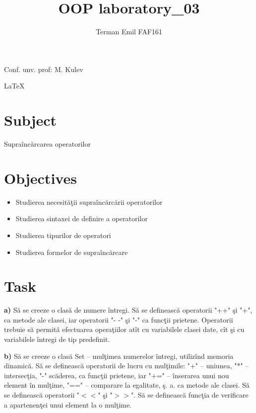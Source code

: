 \documentclass{article}
\begin{document}
	\newcommand{\cppInLine}[1]{
		{\lstinline[basicstyle=\small]|#1|}
	}

	\title{OOP laboratory\_03}
	\author{Terman Emil FAF161}
	\maketitle

	\vspace*{\fill}
	
	\begin{flushright}
		Conf. unv. prof: M. Kulev
	\end{flushright}

	\begin{center}
		\LaTeX
	\end{center}

	\pagebreak

	\section{Subject}
		Supraîncărcarea operatorilor
	\section{Objectives}
		\begin{itemize}
			\item Studierea necesităţii supraîncărcării operatorilor
			\item Studierea sintaxei de definire a operatorilor
			\item Studierea tipurilor de operatori
			\item Studierea formelor de supraîncărcare
		\end{itemize}

	\section{Task}
		\textbf{a)} Să se creeze o clasă de numere întregi. Să se definească operatorii "++" şi "+", ca metode ale clasei, iar operatorii "- -" şi "-" ca funcţii prietene. Operatorii trebuie să permită efectuarea operaţiilor atît cu variabilele clasei date, cît şi cu variabilele întregi de tip predefinit.

		\textbf{b)} Să se creeze o clasă Set – mulţimea numerelor întregi, utilizînd memoria dinamică. Să se definească operatorii de lucru cu mulţimile: "+" – uniunea, "*" – intersecţia, "-" scăderea, ca funcţii prietene, iar "+=" – înserarea unui nou element în mulţime, "==" – comparare la egalitate, ş. a. ca metode ale clasei. Să se definească operatorii "$<<$" şi "$>>$". Să se definească funcţia de verificare a apartenenţei unui element la o mulţime.
\end{document}
